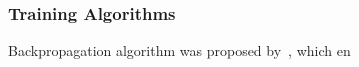 \subsubsection{Training Algorithms}
Backpropagation algorithm was proposed by~\citet{werbos1975beyond}, which en